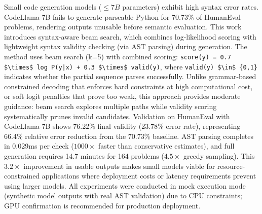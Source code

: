 
Small code generation models ($\leq 7B$ parameters) exhibit high syntax error rates. CodeLlama-7B fails to generate parseable Python for 70.73\% of HumanEval problems, rendering outputs unusable before semantic evaluation. This work introduces syntax-aware beam search, which combines log-likelihood scoring with lightweight syntax validity checking (via AST parsing) during generation. The method uses beam search (k=5) with combined scoring: \texttt{score(y) = 0.7 \$\textbackslash times\$ log P(y|x) + 0.3 \$\textbackslash times\$ valid(y)}, where \texttt{valid(y) \$\textbackslash in\$ \{0,1\}} indicates whether the partial sequence parses successfully. Unlike grammar-based constrained decoding that enforces hard constraints at high computational cost, or soft logit penalties that prove too weak, this approach provides moderate guidance: beam search explores multiple paths while validity scoring systematically prunes invalid candidates. Validation on HumanEval with CodeLlama-7B shows 76.22\% final validity (23.78\% error rate), representing 66.4\% relative error reduction from the 70.73\% baseline. AST parsing completes in 0.029ms per check ($1000\times$ faster than conservative estimates), and full generation requires 14.7 minutes for 164 problems (4.$5\times$ greedy sampling). This 3.$2\times$ improvement in usable outputs makes small models viable for resource-constrained applications where deployment costs or latency requirements prevent using larger models. All experiments were conducted in mock execution mode (synthetic model outputs with real AST validation) due to CPU constraints; GPU confirmation is recommended for production deployment.

